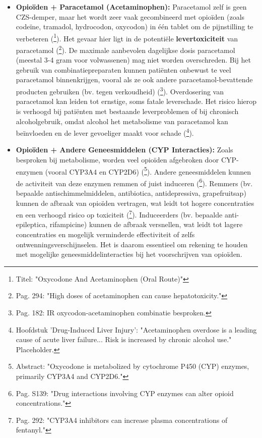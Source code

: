 \documentclass[11pt, a4paper]{report} %
\begin{document}
\begin{itemize}
    \item \textbf{Opioïden + Paracetamol (Acetaminophen):} Paracetamol zelf is geen CZS-demper, maar het wordt zeer vaak gecombineerd met opioïden (zoals codeïne, tramadol, hydrocodon, oxycodon) in één tablet om de pijnstilling te verbeteren (\cite{MayoClinicOxyAcetaminophen}\footnote{Titel: "Oxycodone And Acetaminophen (Oral Route)"}). Het gevaar hier ligt in de potentiële \textbf{levertoxiciteit} van paracetamol (\cite{Gupta2010ChemistryOpioids}\footnote{Pag. 294: "High doses of acetaminophen can cause hepatotoxicity."}). De maximale aanbevolen dagelijkse dosis paracetamol (meestal 3-4 gram voor volwassenen) mag niet worden overschreden. Bij het gebruik van combinatiepreparaten kunnen patiënten onbewust te veel paracetamol binnenkrijgen, vooral als ze ook andere paracetamol-bevattende producten gebruiken (bv. tegen verkoudheid) (\cite{Riley2008OxycodoneReview}\footnote{Pag. 182: IR oxycodon-acetaminophen combinatie besproken.}). Overdosering van paracetamol kan leiden tot ernstige, soms fatale leverschade. Het risico hierop is verhoogd bij patiënten met bestaande leverproblemen of bij chronisch alcoholgebruik, omdat alcohol het metabolisme van paracetamol kan beïnvloeden en de lever gevoeliger maakt voor schade (\cite{SomeHepatologyTextbook}\footnote{Hoofdstuk 'Drug-Induced Liver Injury': "Acetaminophen overdose is a leading cause of acute liver failure... Risk is increased by chronic alcohol use." Placeholder.}).
    \item \textbf{Opioïden + Andere Geneesmiddelen (CYP Interacties):} Zoals besproken bij metabolisme, worden veel opioïden afgebroken door CYP-enzymen (vooral CYP3A4 en CYP2D6) (\cite{Samer2019OxycodonePathway}\footnote{Abstract: "Oxycodone is metabolized by cytochrome P450 (CYP) enzymes, primarily CYP3A4 and CYP2D6."}). Andere geneesmiddelen kunnen de activiteit van deze enzymen remmen of juist induceren (\cite{Trescot2008OpioidPharm}\footnote{Pag. S139: "Drug interactions involving CYP enzymes can alter opioid concentrations."}). Remmers (bv. bepaalde antischimmelmiddelen, antibiotica, antidepressiva, grapefruitsap) kunnen de afbraak van opioïden vertragen, wat leidt tot hogere concentraties en een verhoogd risico op toxiciteit (\cite{Gupta2010ChemistryOpioids}\footnote{Pag. 292: "CYP3A4 inhibitors can increase plasma concentrations of fentanyl."}). Induceerders (bv. bepaalde anti-epileptica, rifampicine) kunnen de afbraak versnellen, wat leidt tot lagere concentraties en mogelijk verminderde effectiviteit of zelfs ontwenningsverschijnselen. Het is daarom essentieel om rekening te houden met mogelijke geneesmiddelinteracties bij het voorschrijven van opioïden.
\end{itemize}
\end{document}
